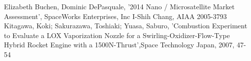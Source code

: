 \begin{thebibliography}{99}
 Elizabeth Buchen, Dominic DePasquale, '2014 Nano / Microsatellite Market Assessment', SpaceWorks Enterprises, Inc
 I-Shih Chang, AIAA 2005-3793
 Kitagawa, Koki; Sakurazawa, Toshiaki; Yuasa, Saburo, 'Combustion Experiment to Evaluate a LOX Vaporization Nozzle for a Swirling-Oxidizer-Flow-Type Hybrid Rocket Engine with a 1500N-Thrust',Space Technology Japan, 2007, 47-54
\end{thebibliography}
